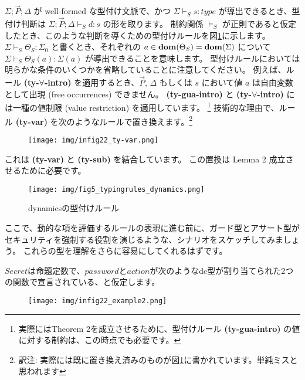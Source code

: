 \documentclass[submit,techreq,noauthor,onecolumn]{ipsj}
\begin{document}
$\Sigma; \vec{P}; \Delta$ が well-formed な型付け文脈で、かつ $\Sigma \vdash_S s:type$ が導出できるとき、型付け判断は $\Sigma; \vec{P}; \Delta \vdash_S d:s$ の形を取ります。
制約関係 $\models_S$ が正則であると仮定したとき、このような判断を導くための型付けルールを図\ref{fig:fig5_typingrules_dynamics}に示します。
$\Sigma \vdash_S \Theta_S : \Sigma_0$ と書くとき、それぞれの $a \in {\bf dom}(\Theta_S) = {\bf dom}(\Sigma)$ について $\Sigma \vdash_S \Theta_S(a) : \Sigma(a)$ が導出できることを意味します。
型付けルールにおいては明らかな条件のいくつかを省略していることに注意してください。
例えば、ルール {\bf(ty-$\forall$-intro)} を適用するとき、$\vec{P}$, $\Delta$ もしくは $s$ において値 $a$ は自由変数として出現 (free occurrences) できません。
{\bf (ty-gua-intro)} と {\bf (ty-$\forall$-intro)} には一種の値制限 (value restriction) を適用しています。
\footnote{実際にはTheorem 2を成立させるために、型付けルール {\bf (ty-gua-intro)} の値に対する制約は、この時点でも必要です。}
技術的な理由で、ルール {\bf (ty-var)} を次のようなルールで置き換えます。\footnote{訳注: 実際には既に置き換え済みのものが図\ref{fig:fig5_typingrules_dynamics}に書かれています。単純ミスと思われます}

\clearpage

\begin{figure}[h]
\centering
\texttt{[image: img/infig22\_ty-var.png]}
\end{figure}

\noindent これは {\bf (ty-var)} と {\bf (ty-sub)} を結合しています。
この置換は Lemma 2 成立させるために必要です。

\begin{figure}[h]
\centering
\texttt{[image: img/fig5\_typingrules\_dynamics.png]}
\caption{dynamicsの型付けルール}
\label{fig:fig5_typingrules_dynamics}
\end{figure}

ここで、動的な項を評価するルールの表現に進む前に、ガード型とアサート型がセキュリティを強制する役割を演じるような、シナリオをスケッチしてみましょう。
これらの型を理解をさらに容易にしてくれるはずです。

\underline{$Secret$}は命題定数で、\underline{$password$}と\underline{$action$}が次のようなdc型が割り当てられた2つの関数で宣言されている、と仮定します。

\begin{figure}[h]
\centering
\texttt{[image: img/infig22\_example2.png]}
\end{figure}
\end{document}
